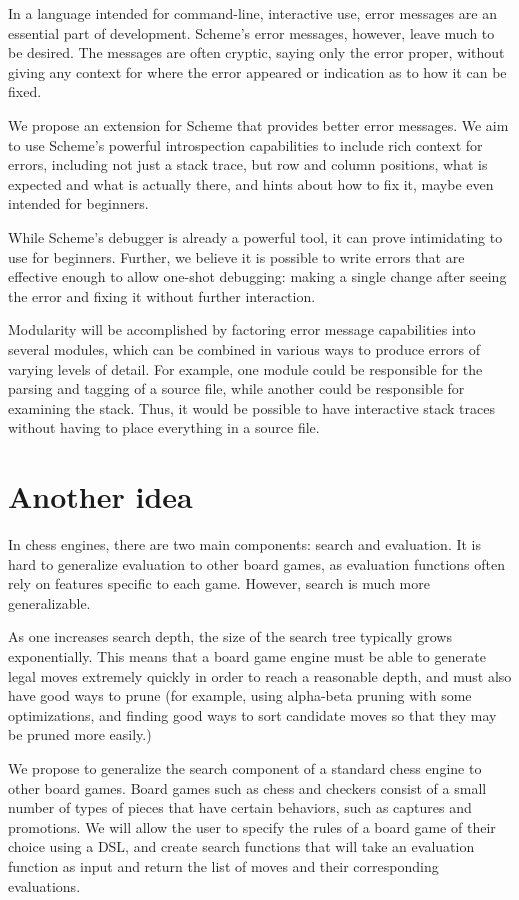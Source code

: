 \documentclass{scrartcl}
\begin{document}
In a language intended for command-line, interactive use, error messages are an
essential part of development. Scheme's error messages, however, leave much to
be desired. The messages are often cryptic, saying only the error proper,
without giving any context for where the error appeared or indication as to how
it can be fixed.

We propose an extension for Scheme that provides better error messages. We aim
to use Scheme's powerful introspection capabilities to include rich context for
errors, including not just a stack trace, but row and column positions, what is
expected and what is actually there, and hints about how to fix it, maybe even
intended for beginners.

While Scheme's debugger is already a powerful tool, it can prove intimidating
to use for beginners. Further, we believe it is possible to write errors that
are effective enough to allow one-shot debugging: making a single change after
seeing the error and fixing it without further interaction.

Modularity will be accomplished by factoring error message capabilities into
several modules, which can be combined in various ways to produce errors of
varying levels of detail. For example, one module could be responsible for the
parsing and tagging of a source file, while another could be responsible for
examining the stack. Thus, it would be possible to have interactive stack
traces without having to place everything in a source file.

 
\section{Another idea}
In chess engines, there are two main components: search and evaluation.
It is hard to generalize evaluation to other board games,
as evaluation functions often rely on features specific to each game.
However, search is much more generalizable.

As one increases search depth, the size of the search tree typically grows
exponentially. This means that a board game engine must be able to
generate legal moves extremely quickly in order to reach a reasonable depth,
and must also have good ways to prune
(for example, using alpha-beta pruning with some optimizations, and finding
good ways to sort candidate moves so that they may be pruned more easily.)

We propose to generalize the search component of a standard chess engine
to other board games. Board games such as chess and checkers consist of
a small number of types of pieces that have certain behaviors,
such as captures and promotions.
We will allow the user to specify the rules of a board game
of their choice using a DSL, and create search functions that will
take an evaluation function as input and return the list of moves
and their corresponding evaluations.
\end{document}
